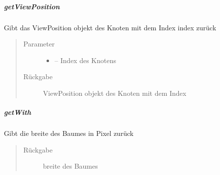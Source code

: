 \documentclass[letterpaper,10pt,ngerman]{sphinxmanual}
\begin{document}
\subparagraph{getViewPosition}
\label{\detokenize{com/linuxluigi/edu/list/SinglyLinkedList:getviewposition}}

\begin{fulllineitems}
\label{\detokenize{com/linuxluigi/edu/list/SinglyLinkedList:com.linuxluigi.edu.list.SinglyLinkedList.getViewPosition(int)}}
Gibt das ViewPosition objekt des Knoten mit dem Index index zurück
\begin{quote}\begin{description}
\item[{Parameter}] \leavevmode\begin{itemize}
\item {} 
 -- Index des Knotens

\end{itemize}

\item[{Rückgabe}] \leavevmode
ViewPosition objekt des Knoten mit dem Index

\end{description}\end{quote}

\end{fulllineitems}



\subparagraph{getWith}
\label{\detokenize{com/linuxluigi/edu/list/SinglyLinkedList:getwith}}

\begin{fulllineitems}
\label{\detokenize{com/linuxluigi/edu/list/SinglyLinkedList:com.linuxluigi.edu.list.SinglyLinkedList.getWith()}}
Gibt die breite des Baumes in Pixel zurück
\begin{quote}\begin{description}
\item[{Rückgabe}] \leavevmode
breite des Baumes

\end{description}\end{quote}

\end{fulllineitems}
\end{document}
